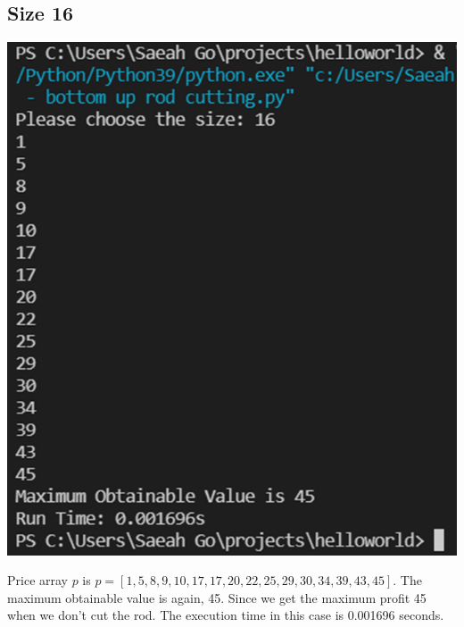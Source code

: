 \documentclass{article}
\begin{document}
\subsection{\textbf{Size 16}}
\begin{center}
\includegraphics[scale = 0.4]{size 16.png} \\
\end{center}
Price array $p$ is $p = [1, 5, 8, 9, 10, 17, 17, 20, 22, 25, 29, 30, 34, 39, 43, 45]$. The maximum obtainable value is again, 45. Since we get the maximum profit 45 when we don't cut the rod. The execution time in this case is 0.001696 seconds.
\end{document}
